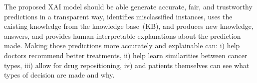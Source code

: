 \hspace*{3.5mm} The proposed XAI model should be able generate accurate, fair, and trustworthy predictions in a transparent way, identifies misclassified instances, uses the existing knowledge from the knowledge base~(KB), and produces new knowledge, answers, and provides human-interpretable explanations about the prediction made. Making those predictions more accurately and explainable can: i) help doctors recommend better treatments, ii) help learn similarities between cancer types, iii) allow for drug repositioning, iv) and patients themselves can see what types of decision are made and why. 

